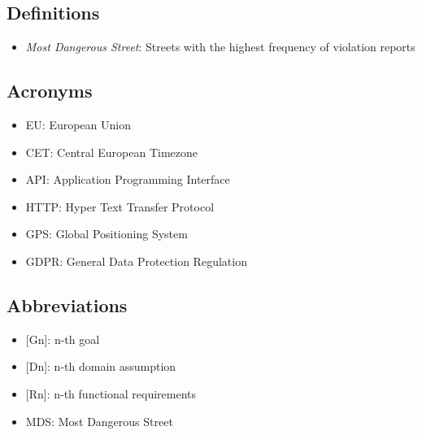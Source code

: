 \subsection{Definitions}
\begin{itemize}
  \item \textit{Most Dangerous Street}: Streets with the highest frequency of violation reports
\end{itemize}

\subsection{Acronyms}
\begin{itemize}
  \item EU: European Union
  \item CET: Central European Timezone
  \item API: Application Programming Interface
  \item HTTP: Hyper Text Transfer Protocol
  \item GPS: Global Positioning System
  \item GDPR: General Data Protection Regulation
\end{itemize}

\subsection{Abbreviations}
\begin{itemize}
  \item {[Gn]}: n-th goal
  \item {[Dn]}: n-th domain assumption
  \item {[Rn]}: n-th functional requirements  
  \item MDS: Most Dangerous Street
\end{itemize}
